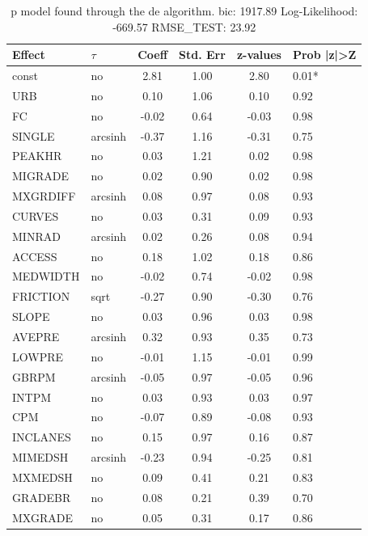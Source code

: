\begin{table}
	\caption{p model found through the de algorithm. bic: 1917.89 Log-Likelihood: -669.57 RMSE_TEST: 23.92}
	\begin{center}
		\begin{tabular}{|l|l|c|c|c|l|}
			\hline
			Effect & $\tau$ & Coeff & Std. Err & z-values & Prob |z|>Z \\
			\hline
			const & no & 2.81 & 1.00 & 2.80 & 0.01* \\
			\hline
			URB & no & 0.10 & 1.06 & 0.10 & 0.92 \\
			\hline
			FC & no & -0.02 & 0.64 & -0.03 & 0.98 \\
			\hline
			SINGLE & arcsinh & -0.37 & 1.16 & -0.31 & 0.75 \\
			\hline
			PEAKHR & no & 0.03 & 1.21 & 0.02 & 0.98 \\
			\hline
			MIGRADE & no & 0.02 & 0.90 & 0.02 & 0.98 \\
			\hline
			MXGRDIFF & arcsinh & 0.08 & 0.97 & 0.08 & 0.93 \\
			\hline
			CURVES & no & 0.03 & 0.31 & 0.09 & 0.93 \\
			\hline
			MINRAD & arcsinh & 0.02 & 0.26 & 0.08 & 0.94 \\
			\hline
			ACCESS & no & 0.18 & 1.02 & 0.18 & 0.86 \\
			\hline
			MEDWIDTH & no & -0.02 & 0.74 & -0.02 & 0.98 \\
			\hline
			FRICTION & sqrt & -0.27 & 0.90 & -0.30 & 0.76 \\
			\hline
			SLOPE & no & 0.03 & 0.96 & 0.03 & 0.98 \\
			\hline
			AVEPRE & arcsinh & 0.32 & 0.93 & 0.35 & 0.73 \\
			\hline
			LOWPRE & no & -0.01 & 1.15 & -0.01 & 0.99 \\
			\hline
			GBRPM & arcsinh & -0.05 & 0.97 & -0.05 & 0.96 \\
			\hline
			INTPM & no & 0.03 & 0.93 & 0.03 & 0.97 \\
			\hline
			CPM & no & -0.07 & 0.89 & -0.08 & 0.93 \\
			\hline
			INCLANES & no & 0.15 & 0.97 & 0.16 & 0.87 \\
			\hline
			MIMEDSH & arcsinh & -0.23 & 0.94 & -0.25 & 0.81 \\
			\hline
			MXMEDSH & no & 0.09 & 0.41 & 0.21 & 0.83 \\
			\hline
			GRADEBR & no & 0.08 & 0.21 & 0.39 & 0.70 \\
			\hline
			MXGRADE & no & 0.05 & 0.31 & 0.17 & 0.86 \\

\end{tabular}
\end{center}
\end{table}
